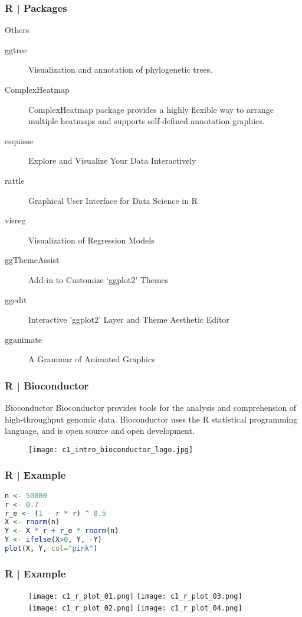 \begin{frame}[fragile]
  \frametitle{R | Packages}
  \begin{block}{Others}
    \begin{description}
      \item[\alert{ggtree}] Visualization and annotation of \alert{phylogenetic trees}.
      \item[\alert{ComplexHeatmap}] ComplexHeatmap package provides a highly flexible way to arrange multiple \alert{heatmaps} and supports self-defined annotation graphics. 
      \item[esquisse] Explore and Visualize Your Data Interactively
      \item[rattle] Graphical User Interface for Data Science in R
      \item[visreg] Visualization of Regression Models
      \item[ggThemeAssist] Add-in to Customize `ggplot2' Themes
      \item[ggedit] Interactive 'ggplot2' Layer and Theme Aesthetic Editor
      \item[gganimate] A Grammar of Animated Graphics
    \end{description}
  \end{block}
\end{frame}

\begin{frame}
  \frametitle{R | \alert{Bioconductor}}
  \begin{block}{Bioconductor}
    Bioconductor provides tools for the analysis and comprehension of high-throughput genomic data. Bioconductor uses the R statistical programming language, and is open source and open development.
  \end{block}
  \begin{figure}
    \centering
    \texttt{[image: c1\_intro\_bioconductor\_logo.jpg]}
  \end{figure}
\end{frame}

\begin{frame}[fragile]
  \frametitle{R | Example}
\begin{lstlisting}[language=R]
n <- 50000
r <- 0.7
r_e <- (1 - r * r) ^ 0.5
X <- rnorm(n)
Y <- X * r + r_e * rnorm(n)
Y <- ifelse(X>0, Y, -Y)
plot(X, Y, col="pink")
\end{lstlisting}
\end{frame}

\begin{frame}
  \frametitle{R | Example}
  \begin{figure}
    \centering
    \texttt{[image: c1\_r\_plot\_01.png]}\qquad
    \texttt{[image: c1\_r\_plot\_03.png]}\\
    \texttt{[image: c1\_r\_plot\_02.png]}
    \hspace{4em}
    \texttt{[image: c1\_r\_plot\_04.png]}
  \end{figure}
\end{frame}


